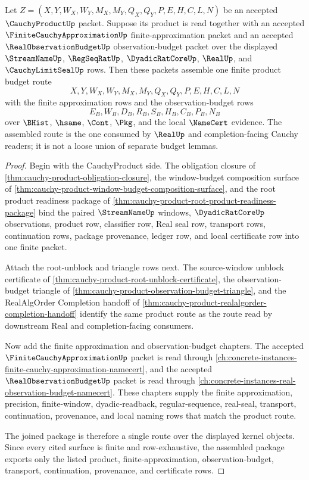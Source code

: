 \begin{theorem}
\label{thm:cauchy-product-budget-route-package}
Let $Z=(X,Y,W_X,W_Y,M_X,M_Y,Q_X,Q_Y,P,E,H,C,L,N)$ be an accepted $\CauchyProductUp$ packet. Suppose its product is read together with an accepted $\FiniteCauchyApproximationUp$ finite-approximation packet and an accepted $\RealObservationBudgetUp$ observation-budget packet over the displayed $\StreamNameUp$, $\RegSeqRatUp$, $\DyadicRatCoreUp$, $\RealUp$, and $\CauchyLimitSealUp$ rows. Then these packets assemble one finite product budget route
$$
X,Y,W_X,W_Y,M_X,M_Y,Q_X,Q_Y,P,E,H,C,L,N
$$
with the finite approximation rows and the observation-budget rows
$$
E_B,W_B,D_B,R_B,S_B,H_B,C_B,P_B,N_B
$$
over $\BHist$, $\hsame$, $\Cont$, $\Pkg$, and the local $\NameCert$ evidence. The assembled route is the one consumed by $\RealUp$ and completion-facing Cauchy readers; it is not a loose union of separate budget lemmas.
\end{theorem}
\begin{proof}
Begin with the CauchyProduct side. The obligation closure of \autoref{thm:cauchy-product-obligation-closure}, the window-budget composition surface of \autoref{thm:cauchy-product-window-budget-composition-surface}, and the root product readiness package of \autoref{thm:cauchy-product-root-product-readiness-package} bind the paired $\StreamNameUp$ windows, $\DyadicRatCoreUp$ observations, product row, classifier row, Real seal row, transport rows, continuation rows, package provenance, ledger row, and local certificate row into one finite packet.

Attach the root-unblock and triangle rows next. The source-window unblock certificate of \autoref{thm:cauchy-product-root-unblock-certificate}, the observation-budget triangle of \autoref{thm:cauchy-product-observation-budget-triangle}, and the RealAlgOrder Completion handoff of \autoref{thm:cauchy-product-realalgorder-completion-handoff} identify the same product route as the route read by downstream Real and completion-facing consumers.

Now add the finite approximation and observation-budget chapters. The accepted $\FiniteCauchyApproximationUp$ packet is read through \autoref{ch:concrete-instances-finite-cauchy-approximation-namecert}, and the accepted $\RealObservationBudgetUp$ packet is read through \autoref{ch:concrete-instances-real-observation-budget-namecert}. These chapters supply the finite approximation, precision, finite-window, dyadic-readback, regular-sequence, real-seal, transport, continuation, provenance, and local naming rows that match the product route.

The joined package is therefore a single route over the displayed kernel objects. Since every cited surface is finite and row-exhaustive, the assembled package exports only the listed product, finite-approximation, observation-budget, transport, continuation, provenance, and certificate rows.
\end{proof}

